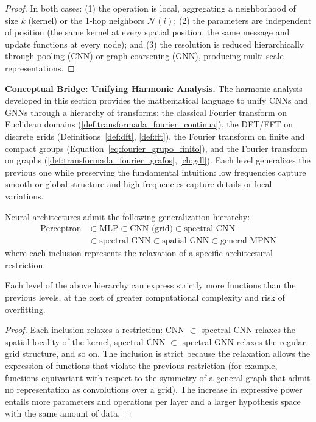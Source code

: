 \begin{proof}
In both cases: (1) the operation is local, aggregating a neighborhood of size $k$ (kernel) or the 1-hop neighbors $\mathcal{N}(i)$; (2) the parameters are independent of position (the same kernel at every spatial position, the same message and update functions at every node); and (3) the resolution is reduced hierarchically through pooling (CNN) or graph coarsening (GNN), producing multi-scale representations.
\end{proof}

\textbf{Conceptual Bridge: Unifying Harmonic Analysis.} The harmonic analysis developed in this section provides the mathematical language to unify CNNs and GNNs through a hierarchy of transforms: the classical Fourier transform on Euclidean domains (\autoref{def:transformada_fourier_continua}), the DFT/FFT on discrete grids (Definitions~\ref{def:dft}, \ref{def:fft}), the Fourier transform on finite and compact groups (Equation~\ref{eq:fourier_grupo_finito}), and the Fourier transform on graphs (\autoref{def:transformada_fourier_grafos}, \autoref{ch:gdl}). Each level generalizes the previous one while preserving the fundamental intuition: low frequencies capture smooth or global structure and high frequencies capture details or local variations.

\begin{theorem}\label{thm:jerarquia_generalizacion_cnn}
Neural architectures admit the following generalization hierarchy:
\begin{align}
\text{Perceptron} &\subset \text{MLP} \subset \text{CNN (grid)} \subset \text{spectral CNN} \nonumber \\
&\subset \text{spectral GNN} \subset \text{spatial GNN} \subset \text{general MPNN}
\end{align}
where each inclusion represents the relaxation of a specific architectural restriction.
\end{theorem}

\begin{corollary}\label{cor:poder_expresivo_creciente}
Each level of the above hierarchy can express strictly more functions than the previous levels, at the cost of greater computational complexity and risk of overfitting.
\end{corollary}

\begin{proof}
Each inclusion relaxes a restriction: CNN $\subset$ spectral CNN relaxes the spatial locality of the kernel, spectral CNN $\subset$ spectral GNN relaxes the regular-grid structure, and so on. The inclusion is strict because the relaxation allows the expression of functions that violate the previous restriction (for example, functions equivariant with respect to the symmetry of a general graph that admit no representation as convolutions over a grid). The increase in expressive power entails more parameters and operations per layer and a larger hypothesis space with the same amount of data.
\end{proof}

